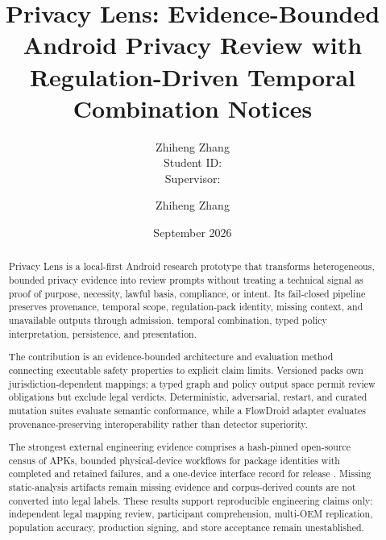 \documentclass[11pt,a4paper]{article}
\title{Privacy Lens: Evidence-Bounded Android Privacy Review with Regulation-Driven Temporal Combination Notices}
\author{Zhiheng Zhang \\ Student ID: \PrivacyLensStudentID \\ Supervisor: \PrivacyLensSupervisor}
\author{Zhiheng Zhang}
\date{September 2026}
\begin{document}
\maketitle
\begin{abstract}
\small\singlespacing
Privacy Lens is a local-first Android research prototype that transforms heterogeneous, bounded privacy evidence into review prompts without treating a technical signal as proof of purpose, necessity, lawful basis, compliance, or intent. Its fail-closed pipeline preserves provenance, temporal scope, regulation-pack identity, missing context, and unavailable outputs through admission, temporal combination, typed policy interpretation, persistence, and presentation.

The contribution is an evidence-bounded architecture and evaluation method connecting executable safety properties to explicit claim limits. Versioned packs own jurisdiction-dependent mappings; a typed graph and policy output space permit review obligations but exclude legal verdicts. Deterministic, adversarial, restart, and curated mutation suites evaluate semantic conformance, while a FlowDroid adapter evaluates provenance-preserving interoperability rather than detector superiority.

The strongest external engineering evidence comprises a hash-pinned open-source census of \FDroidCensusN{} APKs, bounded physical-device workflows for \DevicePackagesN{} package identities with \CompletedWorkflowsN{} completed and \FailedDeviceWorkflowsN{} retained failures, and a one-device interface record for release \PrivacyLensVersion{}. Missing static-analysis artifacts remain missing evidence and corpus-derived counts are not converted into legal labels. These results support reproducible engineering claims only: independent legal mapping review, participant comprehension, multi-OEM replication, population accuracy, production signing, and store acceptance remain unestablished.
\end{abstract}
\newpage
\tableofcontents
\newpage







{\small


}
\end{document}

